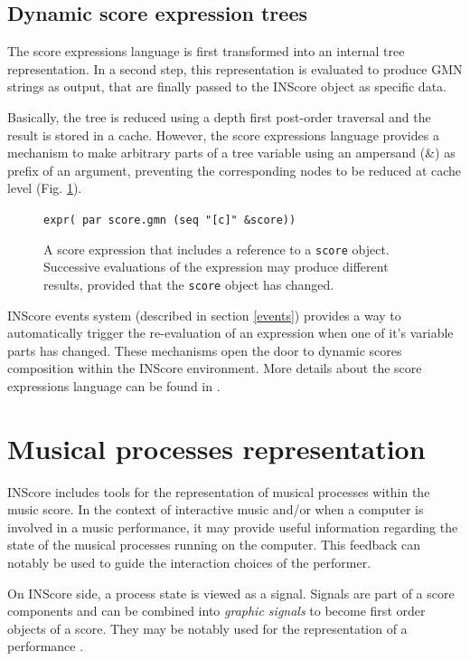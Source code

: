 \documentclass[11pt,a4paper]{article}
\newcommand{\OSC}[1]	{{\fontsize{10pt}{10pt} \selectfont\texttt{#1}}}
\newcommand{\sample}[1]	{\vspace{-0.2em}\begin{center}\colorbox{mygrey}{\begin{minipage}[t]{0.98\columnwidth} {\small \texttt{#1}}\end{minipage}}\end{center}}
\begin{document}
\subsection{Dynamic score expression trees}

The score expressions language is first transformed into an internal tree representation. In a second step, this representation is evaluated to produce GMN strings as output, that are finally passed to the INScore object as specific data. 

Basically, the tree is reduced using a depth first post-order traversal and the result is stored in a cache. However, the score expressions language provides a mechanism to make arbitrary parts of a tree variable using an ampersand (\&) as prefix of an argument, preventing the corresponding nodes to be reduced at cache level (Fig. \ref{fig:scex2}). 
    
\begin{figure}[ht]
\begin{center}
\sample{expr( par score.gmn (seq "[c]" \&score))
}
\caption{A score expression that includes a reference to a \OSC{score} object. Successive evaluations of the expression may produce different results, provided that the \OSC{score} object has changed.}
\label{fig:scex2}
\end{center}
\end{figure}

INScore events system (described in section \ref{events}) provides a way to automatically trigger the re-evaluation of an expression when one  of it's variable parts has changed. These mechanisms open the door to dynamic scores composition within the INScore environment.
More details about the score expressions language can be found in \cite{Lepetit-Aimon_tenor2016}.


\section{Musical processes representation}

INScore includes tools for the representation of musical processes within the music score. In the context of interactive music and/or when a computer is involved in a music performance, it may provide useful information regarding the state of the musical processes running on the computer. This feedback can notably be used to guide the interaction choices of the performer.

On INScore side, a process state is viewed as a signal. Signals are part of a score components and can be combined into \emph{graphic signals} to become first order objects of a score. They may be notably used for the representation of a performance \cite{Fober:12a}. 
\end{document}
